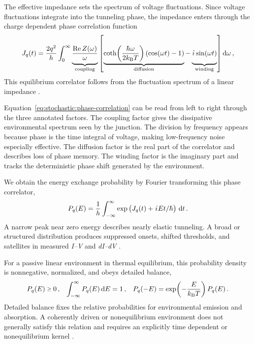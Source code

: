         The effective impedance sets the spectrum of voltage fluctuations. Since voltage fluctuations integrate into the tunneling phase, the impedance enters through the charge dependent phase correlation function
        \begin{equation}
            J_q(t) = \frac{2q^2}{h} \int_0^\infty
            \underbrace{\vphantom{\coth\!\left(\frac{\hbar\omega}{2k_\mathrm{B}T}\right)\left(\cos(\omega t) - 1\right)}\frac{\mathrm{Re}\,Z(\omega)}{\textstyle \omega}}_{\text{coupling}}
            \left[
            \underbrace{\coth\!\left(\frac{\hbar\omega}{2k_\mathrm{B}T}\right)\left(\cos(\omega t) - 1\right)}_{\text{diffusion}}
            -
            \underbrace{\vphantom{\coth\!\left(\frac{\hbar\omega}{2k_\mathrm{B}T}\right)\left(\cos(\omega t) - 1\right)}\ima\sin(\omega t)}_{\text{winding}}
            \right]\mathrm{d}\omega\,,
            \label{eq:stochastic:phase-correlation}
        \end{equation}
        This equilibrium correlator follows from the fluctuation spectrum of a linear impedance \cite{falci_quasiparticle_1991,ingold_charge_1992}.

        Equation~\eqref{eq:stochastic:phase-correlation} can be read from left to right through the three annotated factors. The coupling factor gives the dissipative environmental spectrum seen by the junction. The division by frequency appears because phase is the time integral of voltage, making low-frequency noise especially effective. The diffusion factor is the real part of the correlator and describes loss of phase memory. The winding factor is the imaginary part and tracks the deterministic phase shift generated by the environment.

        We obtain the energy exchange probability by Fourier transforming this phase correlator,
        \begin{equation}
            P_q(E) = \frac{1}{h} \int_{-\infty}^{\infty} \exp\left(J_q(t) + \ima E t/\hbar\right)\,\mathrm{d}t\,.
            \label{eq:stochastic:pe-definition}
        \end{equation}
        A narrow peak near zero energy describes nearly elastic tunneling. A broad or structured distribution produces suppressed onsets, shifted thresholds, and satellites in measured \textit{I--V} and \textit{dI--dV} \cite{falci_quasiparticle_1991,ingold_charge_1992}.

        For a passive linear environment in thermal equilibrium, this probability density is nonnegative, normalized, and obeys detailed balance,
        \begin{align}
            P_q(E)\sgeq{}0\,, && 
            \int_{-\infty}^{\infty}P_q(E)\,\mathrm{d}E=1\,, &&
            P_q(-E)=\exp\!\left(-\frac{E}{k_\mathrm{B}T}\right)P_q(E)\,.
            \label{eq:stochastic:pe-equilibrium}
        \end{align}
        Detailed balance fixes the relative probabilities for environmental emission and absorption. A coherently driven or nonequilibrium environment does not generally satisfy this relation and requires an explicitly time dependent or nonequilibrium kernel \cite{ingold_charge_1992}.

